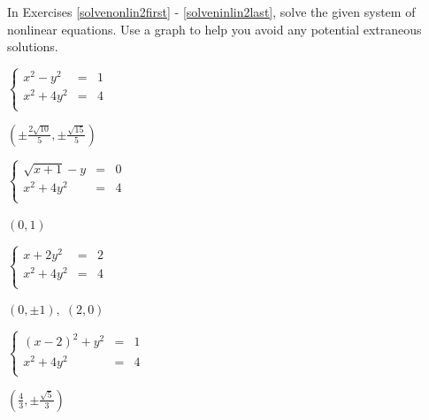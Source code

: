 \documentclass{ximera}
\begin{document}
\begin{question}
In Exercises \ref{solvenonlin2first} - \ref{solveninlin2last}, solve the given system of nonlinear equations.  Use a graph to help you avoid any potential extraneous solutions.

\begin{problem}\label{solvenonlin2first}
$\left\{\begin{array}{rcr}  x^{2} - y^{2} & = & 1 \\ x^{2} + 4y^{2} & = & 4 \\ \end{array} \right.$  

\begin{solution}
    $\left( \pm \frac{2 \sqrt{10}}{5}, \pm \frac{\sqrt{15}}{5} \right)$
\end{solution}
\end{problem}  

\begin{problem}
$\left\{\begin{array}{rcr}  \sqrt{x + 1} - y & = & 0 \\ x^{2} + 4y^{2} & = & 4 \\ \end{array} \right.$

\begin{solution}
    $(0, 1)$
\end{solution}
\end{problem}

\begin{problem}
$\left\{\begin{array}{rcr}  x + 2y^{2} & = & 2 \\ x^{2} + 4y^{2} & = & 4 \\ \end{array} \right.$   

\begin{solution}
    $(0, \pm 1), \; (2, 0)$
\end{solution}
\end{problem}

\begin{problem}
$\left\{\begin{array}{rcr}  (x - 2)^{2} + y^{2} & = & 1 \\ x^{2} + 4y^{2} & = & 4 \\ \end{array} \right.$

\begin{solution}
    $\left( \frac{4}{3}, \pm \frac{\sqrt{5}}{3} \right)$
\end{solution}
\end{problem}


\end{question}
\end{document}
